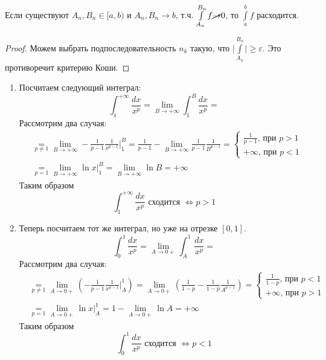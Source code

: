 \begin{notice}
  Если существуют $A_n, B_n \in [a, b)$ и $A_n, B_n \to b$, т.ч.
  $\int\limits_{A_n}^{B_n} f \cancel{\to} 0$, то $\int\limits_{a}^{b} f$ расходится.
\end{notice}
\begin{proof}
  Можем выбрать подпоследовательность $n_k$ такую, что $\Big| \int\limits_{A_n}^{B_n}\Big| \geq \varepsilon$. Это противоречит критерию Коши.
\end{proof}

\begin{examples}
  \begin{enumerate}
    \item Посчитаем следующий интеграл:
    \begin{equation*}
      \int_{1}^{+\infty} \frac{dx}{x^p} = \lim\limits_{B \to +\infty} \int_{1}^{B} \frac{dx}{x^p} =
    \end{equation*}
    Рассмотрим два случая:
    \begin{align*}
        &\underset{p \ne 1}{=} \lim_{B \to +\infty} -\frac{1}{p - 1} \frac{1}{x^{p - 1}}\Big|_{1}^{B} = \frac{1}{p - 1} - \lim\limits_{B \to +\infty} \frac{1}{p - 1}\frac{1}{B^{p - 1}} =
        \begin{cases}
            \frac{1}{p - 1}\text{, при $p > 1$}\\
            +\infty\text{, при $p < 1$}
        \end{cases} \\
        &\underset{p = 1}{=} \lim_{B \to +\infty} \ln x \Big|_{1}^{B} =
        \lim_{B \to +\infty} \ln B = +\infty
    \end{align*}
    Таким образом
    \begin{equation*}
        \int_{1}^{+\infty} \frac{dx}{x^p}\text{ сходится } \iff p > 1
    \end{equation*}

    \item Теперь посчитаем тот же интеграл, но уже на отрезке $[0, 1]$.
    \begin{equation*}
        \int_{0}^{1} \frac{dx}{x^p} = \lim_{A \to 0+} \int_{A}^{1} \frac{dx}{x^p} =
    \end{equation*}
    Рассмотрим два случая:
    \begin{align*}
      &\underset{p \ne 1}{=} \lim\limits_{A \to 0+} \left(-\frac{1}{p - 1}\frac{1}{x^{p - 1}}\Big |_{A}^{1}\right) =
      \lim\limits_{A \to 0+}\left(\frac{1}{1 - p} - \frac{1}{1 - p}\frac{1}{A^{p - 1}}\right) =
      \begin{cases}
        \frac{1}{1 - p}\text{, при $p < 1$}\\
        +\infty\text{, при $p > 1$}
      \end{cases} \\
      &\underset{p = 1}{=} \lim\limits_{A \to 0+} \ln x \Big |_{A}^{1} =
      1 - \lim\limits_{A \to 0+} \ln A = +\infty
    \end{align*}
    Таким образом
    \begin{equation*}
        \int_{0}^{1} \frac{dx}{x^p}\text{ сходится } \iff p < 1
    \end{equation*}
  \end{enumerate}
\end{examples}

